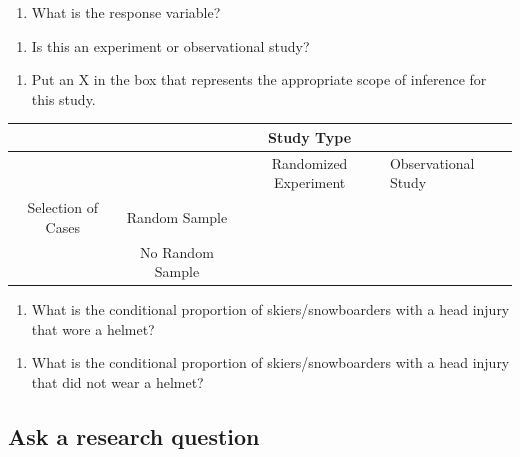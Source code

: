 \documentclass[
]{report}
\providecommand{\tightlist}{%
  \setlength{\itemsep}{0pt}\setlength{\parskip}{0pt}}
\begin{document}
\vspace{0.5in}

\begin{enumerate}
\def\labelenumi{\arabic{enumi}.}
\setcounter{enumi}{1}
\tightlist
\item
  What is the response variable?
\end{enumerate}

\vspace{0.5in}

\begin{enumerate}
\def\labelenumi{\arabic{enumi}.}
\setcounter{enumi}{2}
\tightlist
\item
  Is this an experiment or observational study?
\end{enumerate}

\vspace{0.5in}

\begin{enumerate}
\def\labelenumi{\arabic{enumi}.}
\setcounter{enumi}{3}
\tightlist
\item
  Put an X in the box that represents the appropriate scope of inference for this study.
\end{enumerate}

\begin{longtable}[]{@{}cccl@{}}
\toprule
& & Study Type &\tabularnewline
\midrule
\endhead
& & Randomized Experiment & Observational Study\tabularnewline
Selection of Cases & Random Sample & &\tabularnewline
& No Random Sample & &\tabularnewline
\bottomrule
\end{longtable}

\begin{enumerate}
\def\labelenumi{\arabic{enumi}.}
\setcounter{enumi}{4}
\tightlist
\item
  What is the conditional proportion of skiers/snowboarders with a head injury that wore a helmet?
\end{enumerate}

\vspace{1in}

\begin{enumerate}
\def\labelenumi{\arabic{enumi}.}
\setcounter{enumi}{5}
\tightlist
\item
  What is the conditional proportion of skiers/snowboarders with a head injury that did not wear a helmet?
\end{enumerate}

\vspace{1in}

\hypertarget{ask-a-research-question}{%
\subsection{Ask a research question}\label{ask-a-research-question}}
\end{document}
